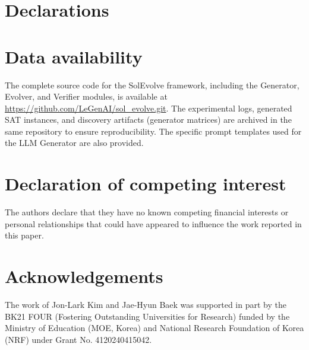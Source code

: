 \section*{Declarations}

\section*{Data availability}
The complete source code for the SolEvolve framework, including the Generator, Evolver, and Verifier modules, is available at \url{https://github.com/LeGenAI/sol_evolve.git}. The experimental logs, generated SAT instances, and discovery artifacts (generator matrices) are archived in the same repository to ensure reproducibility. The specific prompt templates used for the LLM Generator are also provided.

\section*{Declaration of competing interest}
The authors declare that they have no known competing financial interests or personal relationships that could have appeared to influence the work reported in this paper.

\section*{Acknowledgements}
The work of Jon-Lark Kim and Jae-Hyun Baek was supported in part by the BK21 FOUR (Fostering Outstanding Universities for Research) funded by the Ministry of Education (MOE, Korea) and National Research Foundation of Korea (NRF) under Grant No. 4120240415042.
